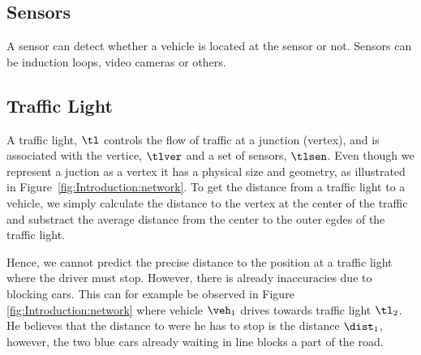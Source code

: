 \subsection{Sensors}
A sensor can detect whether a vehicle is located at the sensor or not. Sensors can be induction loops, video cameras or others.

\subsection{Traffic Light}
A traffic light, $\tl$ controls the flow of traffic at a junction (vertex), and is associated with the vertice, $\tlver$ and a set of sensors, $\tlsen$.
Even though we represent a juction as a vertex it has a physical size and geometry, as illustrated in Figure~\ref{fig:Introduction:network}.
To get the distance from a traffic light to a vehicle, we simply calculate the distance to the vertex at the center of the traffic and substract the average distance from the center to the outer egdes of the traffic light. %

Hence, we cannot predict the precise distance to the position at a traffic light where the driver must stop.
However, there is already inaccuracies due to blocking cars.
This can for example be observed in Figure \ref{fig:Introduction:network} where vehicle $\veh_1$ drives towards traffic light $\tl_2$. 
He believes that the distance to were he has to stop is the distance $\dist_1$, however, the two blue cars already waiting in line blocks a part of the road.




